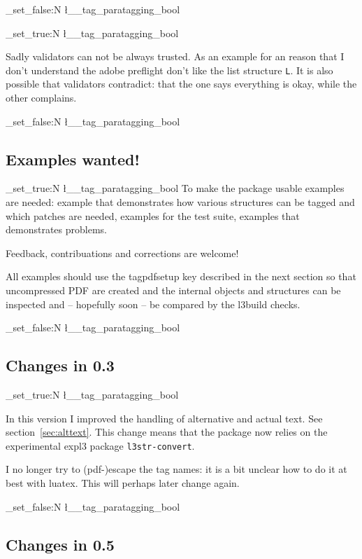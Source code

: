 \documentclass[DIV=12,parskip=half-,bibliography=totoc]{scrartcl}
\newcommand\PDF{PDF}
\newcommand\parataggingON {\bool_set_true:N \l__tag_paratagging_bool}
\newcommand\parataggingOff{\bool_set_false:N \l__tag_paratagging_bool}
\begin{document}
\parataggingOff



\parataggingON

Sadly validators can not be always trusted. As an example for an reason that I don't understand the adobe preflight don't like the list structure \texttt{L}.
It is also possible that validators contradict: that the one says everything is okay, while the other complains.

\parataggingOff

\subsection{Examples wanted!}

\parataggingON
To make the package usable examples are needed: example that demonstrates how various structures can be tagged and which patches are needed, examples for the test suite, examples that demonstrates problems.


\begin{tcolorbox}[before upper=\parataggingON]
Feedback, contribuations and corrections are welcome!
\end{tcolorbox}


All examples should use the tagpdfsetup key  described in the next section so that uncompressed \PDF{} are created and the internal objects and structures can be inspected and -- hopefully soon -- be compared by the l3build checks.%

\parataggingOff

\subsection{Changes in 0.3}

\parataggingON

In this version I improved the handling of alternative and actual text. See section~\ref{sec:alttext}. This change means that the package now relies on the experimental expl3 package \texttt{l3str-convert}.

I no longer try to (pdf-)escape the tag names: it is a bit unclear how to do it at best with luatex. This will perhaps later change again.

\parataggingOff


\subsection{Changes in 0.5}
\end{document}
